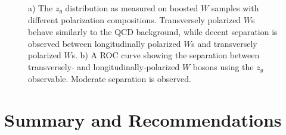 \documentclass[11pt,letterpaper]{article}
\begin{document}
\begin{figure}
\begin{center}
\end{center}
\caption{a) The $z_g$ distribution as measured on boosted $W$ samples with different polarization compositions. Transversely polarized $W$s behave similarly to the QCD background, while decent separation is observed between longitudinally polarized $W$s and transversely polarized $W$s. b) A ROC curve showing the separation between transversely- and longitudinally-polarized $W$ bosons using the $z_g$ observable. Moderate separation is observed.}
\label{fig:z_g_dist}
\end{figure}











\section{Summary and Recommendations}\label{sec:conc}
\end{document}
